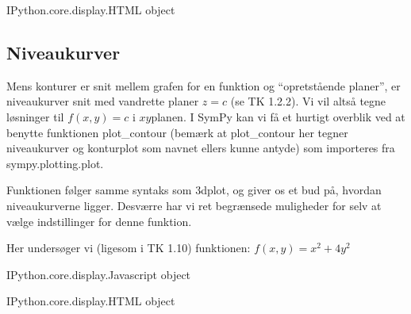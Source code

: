 \documentclass[letterpaper,10pt,english]{jupyterBook}
\begin{document}
\begin{sphinxVerbatim}[commandchars=\\\{\}]
\PYGZlt{}IPython.core.display.HTML object\PYGZgt{}
\end{sphinxVerbatim}


\subsection{Niveaukurver}
\label{\detokenize{notebooks/sympy/Notebook_FlereVar_plot:niveaukurver}}
Mens konturer er snit mellem grafen for en funktion og “opretstående planer”, er niveaukurver snit med vandrette planer \(z=c\) (se TK 1.2.2). Vi vil altså tegne løsninger til \(f(x,y) = c\) i \(xy\)\sphinxhyphen{}planen. I SymPy kan vi få et hurtigt overblik ved at benytte funktionen plot\_contour (bemærk at plot\_contour her tegner niveaukurver og  konturplot som navnet ellers kunne antyde) som importeres fra sympy.plotting.plot.

Funktionen følger samme syntaks som 3dplot, og giver os et bud på, hvordan niveaukurverne ligger. Desværre har vi ret begrænsede muligheder for selv at vælge indstillinger for denne funktion.

Her undersøger vi (ligesom i TK 1.10) funktionen:
\( f(x, y) = x^2 + 4y^2 \)

\begin{sphinxVerbatim}[commandchars=\\\{\}]
   
          

        
\end{sphinxVerbatim}

\begin{sphinxVerbatim}[commandchars=\\\{\}]
\PYGZlt{}IPython.core.display.Javascript object\PYGZgt{}
\end{sphinxVerbatim}

\begin{sphinxVerbatim}[commandchars=\\\{\}]
\PYGZlt{}IPython.core.display.HTML object\PYGZgt{}
\end{sphinxVerbatim}
\end{document}
